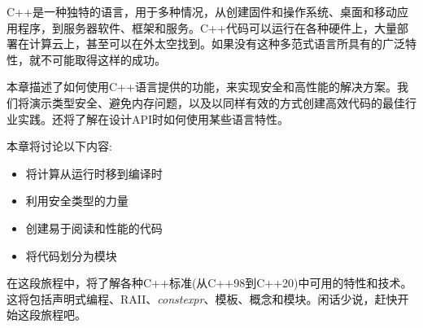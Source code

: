 
C++是一种独特的语言，用于多种情况，从创建固件和操作系统、桌面和移动应用程序，到服务器软件、框架和服务。C++代码可以运行在各种硬件上，大量部署在计算云上，甚至可以在外太空找到。如果没有这种多范式语言所具有的广泛特性，就不可能取得这样的成功。

本章描述了如何使用C++语言提供的功能，来实现安全和高性能的解决方案。我们将演示类型安全、避免内存问题，以及以同样有效的方式创建高效代码的最佳行业实践。还将了解在设计API时如何使用某些语言特性。

本章将讨论以下内容:

\begin{itemize}
\item 将计算从运行时移到编译时
\item 利用安全类型的力量
\item 创建易于阅读和性能的代码
\item 将代码划分为模块
\end{itemize}

在这段旅程中，将了解各种C++标准(从C++98到C++20)中可用的特性和技术。这将包括声明式编程、RAII、\textit{constexpr}、模板、概念和模块。闲话少说，赶快开始这段旅程吧。






